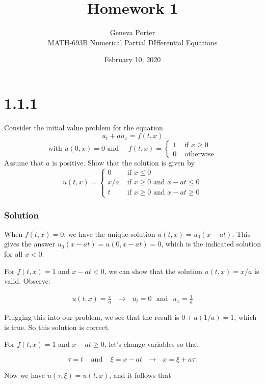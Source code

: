 \documentclass[12pt]{article}
\title{Homework 1}
\author{Geneva Porter\\ 
MATH-693B Numerical Partial DIfferential Equations\\}
\date{February 10, 2020}
\begin{document}
\maketitle

\section*{1.1.1}

Consider the initial value problem for the equation
$$
u_{t}+a u_{x}=f(t, x)
$$
$$
\text { with } u(0, x)=0 \text { and } \quad f(t, x)=\left\{\begin{array}{ll}
{1} & {\text { if } x \geq 0} \\
{0} & {\text { otherwise }}
\end{array}\right.
$$
Assume that $a$ is positive. Show that the solution is given by
$$
u(t, x)=\left\{\begin{array}{ll}
{0} & {\text { if } x \leq 0} \\
{x / a} & {\text { if } x \geq 0 \text { and } x-a t \leq 0} \\
{t} & {\text { if } x \geq 0 \text { and } x-a t \geq 0}
\end{array}\right.
$$

\subsubsection*{Solution}

When $f(t,x)=0$, we have the unique solution $u(t,x) = u_0(x-at)$. This gives the answer $u_0(x-at) = u(0, x-at) = 0$, which is the indicated solution for all $x<0$. 

For $f(t,x)=1$ and $x-at <0$, we can show that the solution $u(t,x)=x/a$ is valid. Observe:


\begin{equation*}
\begin{aligned}
u(t,x) = \frac{x}{a} ~~~ \longrightarrow ~~~ u_t = 0 ~~~ \text{and} ~~~ u_x = \frac{1}{a}
\end{aligned}
\end{equation*}

\noindent Plugging this into our problem, we see that the result is $0 +a(1/a) = 1$, which is true. So this solution is correct.

For $f(t,x)=1$ and $x-at \geq 0$, let's change variables so that

$$ \tau=t ~~~~~\text{and} ~~~~~ \xi=x-at ~~~ \longrightarrow ~~~ x = \xi +a\tau.$$

\noindent Now we have $\tilde{u}(\tau, \xi) = u(t,x)$, and it follows that
\end{document}
